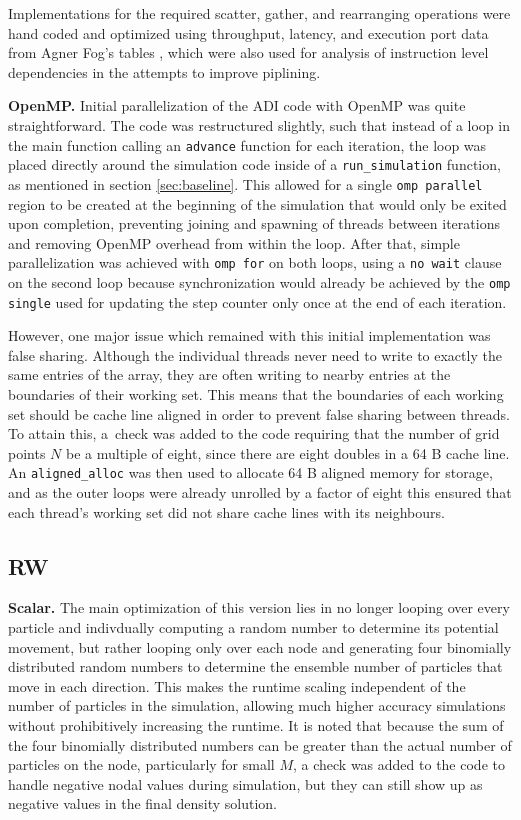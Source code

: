 \documentclass[letterpaper]{article}
\newcommand{\mypar}[1]{{\bf #1.}}
\begin{document}
Implementations for the required scatter, gather, and rearranging operations were hand coded and optimized using throughput, latency, and execution port data from Agner Fog's tables \cite{Agner}, which were also used for analysis of instruction level dependencies in the attempts to improve piplining.

\mypar{OpenMP}
Initial parallelization of the ADI code with OpenMP was quite straightforward. The code was restructured slightly, such that instead of a loop in the main function calling an {\tt advance} function for each iteration, the loop was placed directly around the simulation code inside of a {\tt run\_simulation} function, as mentioned in section \ref{sec:baseline}. This allowed for a single {\tt omp parallel} region to be created at the beginning of the simulation that would only be exited upon completion, preventing joining and spawning of threads between iterations and removing OpenMP overhead from within the loop. After that, simple parallelization was achieved with {\tt omp for} on both loops, using a {\tt no wait} clause on the second loop because synchronization would already be achieved by the {\tt omp single} used for updating the step counter only once at the end of each iteration.

However, one major issue which remained with this initial implementation was false sharing. Although the individual threads never need to write to exactly the same entries of the array, they are often writing to nearby entries at the boundaries of their working set. This means that the boundaries of each working set should be cache line aligned in order to prevent false sharing between threads. To attain this, a~check was added to the code requiring that the number of grid points $N$ be a multiple of eight, since there are eight doubles in a 64 B cache line. An {\tt aligned\_alloc} was then used to allocate 64 B aligned memory for storage, and as the outer loops were already unrolled by a factor of eight this ensured that each thread's working set did not share cache lines with its neighbours.


\subsection{RW}\label{subsec:RW_method}

\mypar{Scalar}
The main optimization of this version lies in no longer looping over every particle and indivdually computing a random number to determine its potential movement, but rather looping only over each node and generating four binomially distributed random numbers to determine the ensemble number of particles that move in each direction. This makes the runtime scaling independent of the number of particles in the simulation, allowing much higher accuracy simulations  without prohibitively increasing the runtime. It is noted that because the sum of the four binomially distributed numbers can be greater than the actual number of particles on the node, particularly for small $M$, a check was added to the code to handle negative nodal values during simulation, but they can still show up as negative values in the final density solution.
\end{document}

